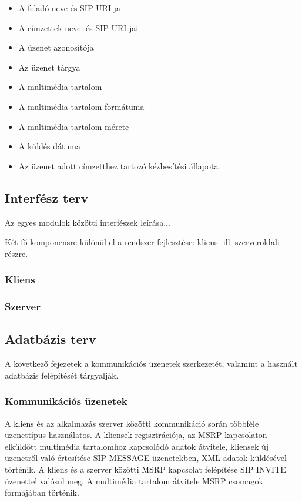 \begin{itemize}\itemsep1pt
\item	A feladó neve és SIP URI-ja
\item A címzettek nevei és SIP URI-jai
\item A üzenet azonosítója
\item Az üzenet tárgya
\item A multimédia tartalom
\item A multimédia tartalom formátuma
\item A multimédia tartalom mérete
\item A küldés dátuma
\item Az üzenet adott címzetthez tartozó kézbesítési állapota
\end{itemize}

\subsection{Interfész terv}
\label{sec:interfesz_terv}

Az egyes modulok közötti interfészek leírása...

Két fő komponensre különül el a rendszer fejlesztése: kliens-
ill. szerveroldali részre.

\subsubsection{Kliens}
\label{sec:kliensinterfesz}

\subsubsection{Szerver}
\label{sec:szerverinterfesz}

\subsection{Adatbázis terv}

A következő fejezetek a kommunikációs üzenetek szerkezetét, valamint a használt adatbázis felépítését tárgyalják.

\subsubsection{Kommunikációs üzenetek}
\label{sec:komm_uzenetek}

A kliens és az alkalmazás szerver közötti kommunikáció során többféle üzenettípus használatos. A kliensek regisztrációja, az MSRP kapcsolaton elküldött multimédia tartalomhoz kapcsolódó adatok átvitele, kliensek új üzenetről való értesítése SIP MESSAGE üzenetekben, XML adatok küldésével történik. A kliens és a szerver közötti MSRP kapcsolat felépítése SIP INVITE üzenettel valósul meg. A multimédia tartalom átvitele MSRP csomagok formájában történik. 

